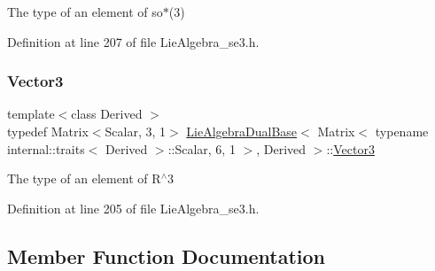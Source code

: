 The type of an element of so$\ast$(3) 

Definition at line 207 of file Lie\+Algebra\+\_\+se3.\+h.

\hypertarget{class_lie_algebra_dual_base_3_01_matrix_3_01typename_01internal_1_1traits_3_01_derived_01_4_1_1_7557dc73cbfcbc32e399b9855a977d47_acd7fd5207d2c438f3f26f99eeedf280d}{}\label{class_lie_algebra_dual_base_3_01_matrix_3_01typename_01internal_1_1traits_3_01_derived_01_4_1_1_7557dc73cbfcbc32e399b9855a977d47_acd7fd5207d2c438f3f26f99eeedf280d} 
\subsubsection{\texorpdfstring{Vector3}{Vector3}}
{\footnotesize\ttfamily template$<$class Derived $>$ \\
typedef Matrix$<$Scalar, 3, 1$>$ \hyperlink{class_lie_algebra_dual_base}{Lie\+Algebra\+Dual\+Base}$<$ Matrix$<$ typename internal\+::traits$<$ Derived $>$\+::Scalar, 6, 1 $>$, Derived $>$\+::\hyperlink{class_lie_algebra_dual_base_3_01_matrix_3_01typename_01internal_1_1traits_3_01_derived_01_4_1_1_7557dc73cbfcbc32e399b9855a977d47_acd7fd5207d2c438f3f26f99eeedf280d}{Vector3}}

The type of an element of R$^\wedge$3 

Definition at line 205 of file Lie\+Algebra\+\_\+se3.\+h.



\subsection{Member Function Documentation}
\hypertarget{class_lie_algebra_dual_base_3_01_matrix_3_01typename_01internal_1_1traits_3_01_derived_01_4_1_1_7557dc73cbfcbc32e399b9855a977d47_ab589c3ff57eafff4e03df29ad2671565}{}\label{class_lie_algebra_dual_base_3_01_matrix_3_01typename_01internal_1_1traits_3_01_derived_01_4_1_1_7557dc73cbfcbc32e399b9855a977d47_ab589c3ff57eafff4e03df29ad2671565} 
